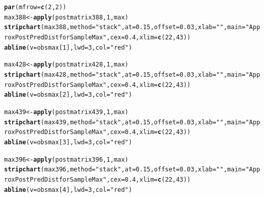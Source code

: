 \documentclass[12pt]{article}\usepackage[]{graphicx}\usepackage[]{color}
\makeatletter
\newcommand{\hlnum}[1]{\textcolor[rgb]{0.686,0.059,0.569}{#1}}%
\newcommand{\hlstr}[1]{\textcolor[rgb]{0.192,0.494,0.8}{#1}}%
\newcommand{\hlstd}[1]{\textcolor[rgb]{0.345,0.345,0.345}{#1}}%
\newcommand{\hlkwb}[1]{\textcolor[rgb]{0.69,0.353,0.396}{#1}}%
\newcommand{\hlkwc}[1]{\textcolor[rgb]{0.333,0.667,0.333}{#1}}%
\newcommand{\hlkwd}[1]{\textcolor[rgb]{0.737,0.353,0.396}{\textbf{#1}}}%
\newenvironment{kframe}{%
 \def\at@end@of@kframe{}%
 \ifinner\ifhmode%
  \def\at@end@of@kframe{\end{minipage}}%
  \begin{minipage}{\columnwidth}%
 \fi\fi%
 \def\FrameCommand##1{\hskip\@totalleftmargin \hskip-\fboxsep
 \colorbox{shadecolor}{##1}\hskip-\fboxsep
     \hskip-\linewidth \hskip-\@totalleftmargin \hskip\columnwidth}%
 \MakeFramed {\advance\hsize-\width
   \@totalleftmargin\z@ \linewidth\hsize
   \@setminipage}}%
 {\par\unskip\endMakeFramed%
 \at@end@of@kframe}
\newenvironment{knitrout}{}{} %
\makeatother
\begin{document}
\begin{knitrout}\footnotesize
{}\color{fgcolor}\begin{kframe}
\begin{alltt}
\hlkwd{par}\hlstd{(}\hlkwc{mfrow}\hlstd{=}\hlkwd{c}\hlstd{(}\hlnum{2}\hlstd{,}\hlnum{2}\hlstd{))}
\hlstd{max388} \hlkwb{<-} \hlkwd{apply}\hlstd{(postmatrix388,} \hlnum{1}\hlstd{, max)}
\hlkwd{stripchart}\hlstd{(max388,} \hlkwc{method}\hlstd{=}\hlstr{"stack"}\hlstd{,} \hlkwc{at}\hlstd{=}\hlnum{0.15}\hlstd{,} \hlkwc{offset}\hlstd{=}\hlnum{0.03}\hlstd{,} \hlkwc{xlab}\hlstd{=}\hlstr{""}\hlstd{,} \hlkwc{main}\hlstd{=}\hlstr{"Approx Post Pred Dist for Sample Max"}\hlstd{,} \hlkwc{cex}\hlstd{=}\hlnum{0.4}\hlstd{,} \hlkwc{xlim}\hlstd{=}\hlkwd{c}\hlstd{(}\hlnum{22}\hlstd{,} \hlnum{43}\hlstd{))}
\hlkwd{abline}\hlstd{(}\hlkwc{v}\hlstd{=obsmax[}\hlnum{1}\hlstd{],} \hlkwc{lwd}\hlstd{=}\hlnum{3}\hlstd{,} \hlkwc{col}\hlstd{=}\hlstr{"red"}\hlstd{)}

\hlstd{max428} \hlkwb{<-} \hlkwd{apply}\hlstd{(postmatrix428,} \hlnum{1}\hlstd{, max)}
\hlkwd{stripchart}\hlstd{(max428,} \hlkwc{method}\hlstd{=}\hlstr{"stack"}\hlstd{,} \hlkwc{at}\hlstd{=}\hlnum{0.15}\hlstd{,} \hlkwc{offset}\hlstd{=}\hlnum{0.03}\hlstd{,} \hlkwc{xlab}\hlstd{=}\hlstr{""}\hlstd{,} \hlkwc{main}\hlstd{=}\hlstr{"Approx Post Pred Dist for Sample Max"}\hlstd{,} \hlkwc{cex}\hlstd{=}\hlnum{0.4}\hlstd{,} \hlkwc{xlim}\hlstd{=}\hlkwd{c}\hlstd{(}\hlnum{22}\hlstd{,} \hlnum{43}\hlstd{))}
\hlkwd{abline}\hlstd{(}\hlkwc{v}\hlstd{=obsmax[}\hlnum{2}\hlstd{],} \hlkwc{lwd}\hlstd{=}\hlnum{3}\hlstd{,} \hlkwc{col}\hlstd{=}\hlstr{"red"}\hlstd{)}

\hlstd{max439} \hlkwb{<-} \hlkwd{apply}\hlstd{(postmatrix439,} \hlnum{1}\hlstd{, max)}
\hlkwd{stripchart}\hlstd{(max439,} \hlkwc{method}\hlstd{=}\hlstr{"stack"}\hlstd{,} \hlkwc{at}\hlstd{=}\hlnum{0.15}\hlstd{,} \hlkwc{offset}\hlstd{=}\hlnum{0.03}\hlstd{,} \hlkwc{xlab}\hlstd{=}\hlstr{""}\hlstd{,} \hlkwc{main}\hlstd{=}\hlstr{"Approx Post Pred Dist for Sample Max"}\hlstd{,} \hlkwc{cex}\hlstd{=}\hlnum{0.4}\hlstd{,} \hlkwc{xlim}\hlstd{=}\hlkwd{c}\hlstd{(}\hlnum{22}\hlstd{,} \hlnum{43}\hlstd{))}
\hlkwd{abline}\hlstd{(}\hlkwc{v}\hlstd{=obsmax[}\hlnum{3}\hlstd{],} \hlkwc{lwd}\hlstd{=}\hlnum{3}\hlstd{,} \hlkwc{col}\hlstd{=}\hlstr{"red"}\hlstd{)}

\hlstd{max396} \hlkwb{<-} \hlkwd{apply}\hlstd{(postmatrix396,} \hlnum{1}\hlstd{, max)}
\hlkwd{stripchart}\hlstd{(max396,} \hlkwc{method}\hlstd{=}\hlstr{"stack"}\hlstd{,} \hlkwc{at}\hlstd{=}\hlnum{0.15}\hlstd{,} \hlkwc{offset}\hlstd{=}\hlnum{0.03}\hlstd{,} \hlkwc{xlab}\hlstd{=}\hlstr{""}\hlstd{,} \hlkwc{main}\hlstd{=}\hlstr{"Approx Post Pred Dist for Sample Max"}\hlstd{,} \hlkwc{cex}\hlstd{=}\hlnum{0.4}\hlstd{,} \hlkwc{xlim}\hlstd{=}\hlkwd{c}\hlstd{(}\hlnum{22}\hlstd{,} \hlnum{43}\hlstd{))}
\hlkwd{abline}\hlstd{(}\hlkwc{v}\hlstd{=obsmax[}\hlnum{4}\hlstd{],} \hlkwc{lwd}\hlstd{=}\hlnum{3}\hlstd{,} \hlkwc{col}\hlstd{=}\hlstr{"red"}\hlstd{)}
\end{alltt}
\end{kframe}
\end{knitrout}
\end{document}
